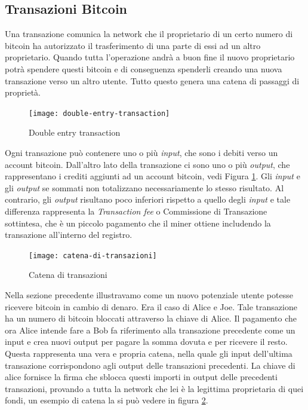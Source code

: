 \subsection{Transazioni Bitcoin}
Una transazione comunica la network che il proprietario di un certo numero di bitcoin ha autorizzato il trasferimento di una parte di essi ad un altro proprietario. Quando tutta l'operazione andrà a buon fine il nuovo proprietario potrà spendere questi bitcoin e di conseguenza spenderli creando una nuova transazione verso un altro utente. Tutto questo genera una catena di passaggi di proprietà.
\begin{figure}
	\centering 
	\texttt{[image: double-entry-transaction]} 
	\caption[Double entry transaction]{Double entry transaction}
	\label{fig:double-entry-transaction} 
\end{figure}
Ogni transazione può contenere uno o più \textit{input}, che sono i debiti verso un account bitcoin. Dall'altro lato della transazione ci sono uno o più \textit{output}, che rappresentano i crediti aggiunti ad un account bitcoin, vedi Figura \ref{fig:double-entry-transaction}. Gli \textit{input} e gli \textit{output} se sommati non totalizzano necessariamente lo stesso risultato. Al contrario, gli \textit{output} risultano poco inferiori rispetto a quello degli \textit{input} e tale differenza rappresenta la \textit{Transaction fee} o Commissione di Transazione sottintesa, che è un piccolo pagamento che il miner ottiene includendo la transazione all'interno del registro. 
\begin{figure}
	\centering 
	\texttt{[image: catena-di-transazioni]} 
	\caption[Catena di transazioni]{Catena di transazioni}
	\label{fig:catena-di-transazioni} 
\end{figure}
Nella sezione precedente illustravamo come un nuovo potenziale utente potesse ricevere bitcoin in cambio di denaro. Era il caso di Alice e Joe. Tale transazione ha un numero di bitcoin bloccati attraverso la chiave di Alice. Il pagamento che ora Alice intende fare a Bob fa riferimento alla transazione precedente come un input e crea nuovi output per pagare la somma dovuta e per ricevere il resto. Questa rappresenta una vera e propria catena, nella quale gli input dell'ultima transazione corrispondono agli output delle transazioni precedenti. La chiave di alice fornisce la firma che sblocca questi importi in output delle precedenti transazioni, provando a tutta la network che lei è la legittima proprietaria di quei fondi, un esempio di catena la si può vedere in figura \ref{fig:catena-di-transazioni}.

